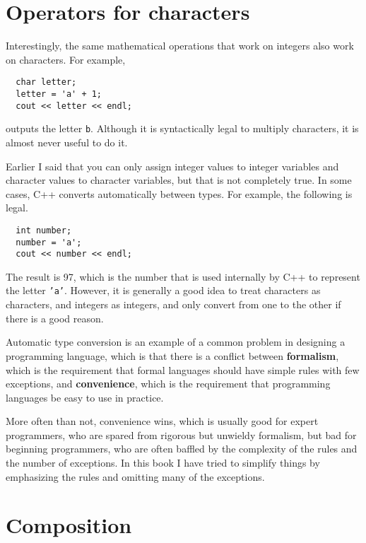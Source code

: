\section{Operators for characters}

Interestingly, the same mathematical operations that work on
integers also work on characters.  For example,

\begin{verbatim}
  char letter;
  letter = 'a' + 1;
  cout << letter << endl;
\end{verbatim}
%
outputs the letter {\tt b}.  Although it is syntactically legal
to multiply characters, it is almost never useful to do it.

Earlier I said that you can only assign integer values to
integer variables and character values to character variables,
but that is not completely true.  In some cases, C++ converts
automatically between types.  For example, the following is
legal.

\begin{verbatim}
  int number;
  number = 'a';
  cout << number << endl;
\end{verbatim}
%
The result is 97, which is the number that is used internally
by C++ to represent the letter {\tt 'a'}.  However, it is
generally a good idea to treat characters as characters, and
integers as integers, and only convert from one to the other
if there is a good reason.

Automatic type conversion is an example of a common problem in designing a
programming language, which is that there is a conflict between {\bf
formalism}, which is the requirement that formal languages should have
simple rules with few exceptions, and {\bf convenience}, which is the
requirement that programming languages be easy to use in practice.

More often than not, convenience wins, which is usually good for
expert programmers, who are spared from rigorous but unwieldy
formalism, but bad for beginning programmers, who are often baffled
by the complexity of the rules and the number of exceptions.  In this
book I have tried to simplify things by emphasizing the rules and
omitting many of the exceptions.


\section{Composition}

